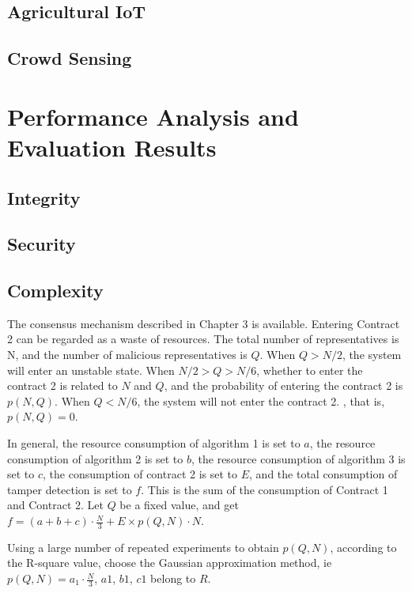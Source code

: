 \documentclass{ieeeaccess}
\begin{document}
\subsection{Agricultural IoT}

\subsection{Crowd Sensing}

\section{Performance Analysis and Evaluation Results}

\subsection{Integrity}

\subsection{Security}

\subsection{Complexity}

The consensus mechanism described in Chapter 3 is available. Entering Contract 2 can be regarded as a waste of resources. The total number of representatives is N, and the number of malicious representatives is $Q$. When $Q > N/2$, the system will enter an unstable state. When $N/2 > Q > N/6$, whether to enter the contract 2 is related to $N$ and $Q$, and the probability of entering the contract 2 is $p(N,Q)$. When $Q < N/6$, the system will not enter the contract 2. , that is, $p(N,Q)=0$.

In general, the resource consumption of algorithm 1 is set to $a$, the resource consumption of algorithm 2 is set to $b$, the resource consumption of algorithm 3 is set to $c$, the consumption of contract 2 is set to $E$, and the total consumption of tamper detection is set to $f$. This is the sum of the consumption of Contract 1 and Contract 2. Let $Q$ be a fixed value, and get $f = (a + b + c) \cdot \frac{N}{3} + E \times p(Q,N) \cdot N$.

Using a large number of repeated experiments to obtain $p(Q, N)$, according to the R-square value, choose the Gaussian approximation method, ie
$p(Q,N) = a_1  \cdot \frac{N}{3}$, $a1$, $b1$, $c1$ belong to $R$.
\end{document}
